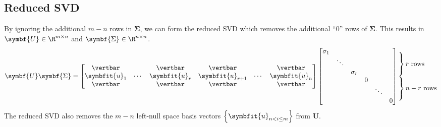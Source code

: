 \documentclass{article}
\begin{document}
\subsection{Reduced SVD}
By ignoring the additional \(m - n\) rows in \(\symbf{\Sigma}\), we can form the reduced SVD which removes the
additional ``0'' rows of \(\symbf{\Sigma}\). This results in \(\symbf{U} \in \R^{m \times n}\) and
\(\symbf{\Sigma} \in \R^{n \times n}\).
\begin{equation*}
    \symbf{U} \symbf{\Sigma} = \begin{bmatrix}
        \vertbar      &        & \vertbar      & \vertbar          &        & \vertbar      \\
        \symbfit{u}_1 & \cdots & \symbfit{u}_r & \symbfit{u}_{r+1} & \cdots & \symbfit{u}_n \\
        \vertbar      &        & \vertbar      & \vertbar          &        & \vertbar
    \end{bmatrix} \begin{bmatrix}
        \sigma_1 &        &          &   &        &   \\
                 & \ddots &          &   &        &   \\
                 &        & \sigma_r &   &        &   \\
                 &        &          & 0 &        &   \\
                 &        &          &   & \ddots &   \\
                 &        &          &   &        & 0
    \end{bmatrix}
    \setlength{\arraycolsep}{0pt}
    \begin{array}{ l }
        \left.\kern-\nulldelimiterspace
        \vphantom{\begin{array}{ c }
                          0 \\
                          0 \\
                          0
                      \end{array}}
        \right\}\text{\(r\) rows} \\
        \left.\kern-\nulldelimiterspace
        \vphantom{\begin{array}{ c }
                          0 \\
                          0 \\
                          0
                      \end{array}}
        \right\}\text{\(n - r\) rows}
    \end{array}
\end{equation*}
The reduced SVD also removes the \(m - n\) left-null space basis vectors \(\left\{ \symbfit{u}_{n < i \leq m} \right\}\) from \(\symbf{U}\).
\end{document}
